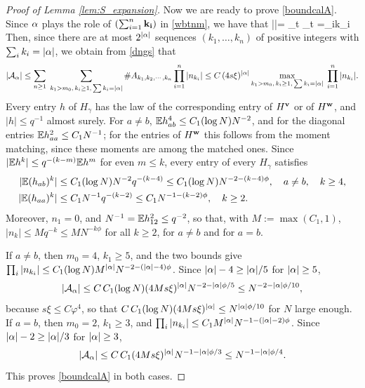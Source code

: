 \begin{proof}[Proof of Lemma \ref{lem:S_expansion}]
Now we are ready to prove \eqref{boundcalA}. Since $\alpha$ plays the role of $(\sum_{i=1}^n {\bf k_i})$ in \eqref{wbtnm}, we have that
\be
|\al|= \sum_t \al_t =\sum_{i}k_i
\ee
Then, since there are at most $2^{|\alpha|}$ sequences $(k_1,\dots,k_n)$ of positive integers with $\sum_ik_i=|\alpha|$, we obtain from \eqref{dngs} that 
$$
|\mathcal A_{\alpha }|\leq  \sum_{n\ge1}\;\sum_{k_1>m_0,\,k_i\ge1,\,\sum k_i=|\alpha|}\#A_{k_1,k_2,\cdots, k_n}\prod_{i=1}^n |n_{k_i}|\le C\,(4s\xi)^{|\alpha|}\max_{k_1>m_0,\,k_i\ge1,\,\sum k_i=|\alpha|}\;\prod_{i=1}^n|n_{k_i}|.
$$
Every entry $h$ of $H_\gamma$ has the law of the corresponding entry of $H^{\mathbf{v}}$ or of $H^{\mathbf{w}}$, and $|h|\le q^{-1}$ almost surely. For $a\ne b$, $\mathbb{E} h_{ab}^4\le C_1(\log N)N^{-2}$, and for the diagonal entries $\mathbb{E} h_{aa}^2\le C_1N^{-1}$; for the entries of $H^{\mathbf{w}}$ this follows from the moment matching, since these moments are among the matched ones. Since $|\mathbb{E} h^k|\le q^{-(k-m)}\mathbb{E} h^m$ for even $m\le k$, every entry of every $H_\gamma$ satisfies
\begin{equation}\begin{split}
|\mathbb{E} (h_{ab})^k| &\leq  C_1(\log N)N^{-2}q^{-(k-4)}\le C_1(\log N)N^{-2-(k-4)\phi}, \quad a\ne b,\quad k\ge 4,\\
|\mathbb{E} (h_{aa})^k| &\leq  C_1N^{-1}q^{-(k-2)}\le C_1N^{-1-(k-2)\phi}, \quad k\ge 2.
\end{split}\end{equation}
Moreover, $n_1=0$, and $N^{-1}=\mathbb{E} h_{12}^2\le q^{-2}$, so that, with $M:=\max(C_1,1)$, $|n_k|\le M q^{-k}\le MN^{-k\phi}$ for all $k\ge2$, for $a\ne b$ and for $a=b$. 

If $a\ne b$, then $m_0=4$, $k_1\ge5$, and the two bounds give $\prod_i|n_{k_i}|\le C_1(\log N)M^{|\alpha|}N^{-2-(|\alpha|-4)\phi}$. Since $|\alpha|-4\ge|\alpha|/5$ for $|\alpha|\ge5$, 
$$
|\mathcal A_\alpha|\le C\,C_1(\log N)(4Ms\xi)^{|\alpha|}N^{-2-|\alpha|\phi/5}\le N^{-2-|\alpha|\phi/10},
$$
because $s\xi\le C\varphi^4$, so that $C\,C_1(\log N)(4Ms\xi)^{|\alpha|}\le N^{|\alpha|\phi/10}$ for $N$ large enough. If $a=b$, then $m_0=2$, $k_1\ge3$, and $\prod_i|n_{k_i}|\le C_1M^{|\alpha|}N^{-1-(|\alpha|-2)\phi}$. Since $|\alpha|-2\ge|\alpha|/3$ for $|\alpha|\ge3$, 
$$
|\mathcal A_\alpha|\le C\,C_1(4Ms\xi)^{|\alpha|}N^{-1-|\alpha|\phi/3}\le N^{-1-|\alpha|\phi/4}.
$$
This proves \eqref{boundcalA} in both cases.


\end{proof}
